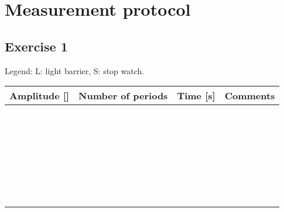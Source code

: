 \documentclass[a4paper,german,12pt,smallheadings]{scrartcl}
\begin{document}
\section*{Measurement protocol}
\subsection*{Exercise 1}
Legend: L: light barrier, S: stop watch.

\begin{tabular}{l|l|l|l}
  Amplitude [\quad\quad] & Number of periods & Time [s] \qquad\qquad\qquad & Comments \qquad\qquad\qquad\qquad\qquad\qquad \\
  \hline
   &  &  &  \\
  \hline
   &  &  &  \\
  \hline
   &  &  &  \\
  \hline
   &  &  &  \\
  \hline
   &  &  &  \\
  \hline
   &  &  &  \\
  \hline
   &  &  &  \\
  \hline
   &  &  &  \\
  \hline
   &  &  &  \\
  \hline
   &  &  &  \\
  \hline
   &  &  &  \\
  \hline
   &  &  &  \\
  \hline
   &  &  &  \\
  \hline
   &  &  &  \\
  \hline
   &  &  &  \\
  \hline
   &  &  &  \\
  \hline
   &  &  &  \\
  \hline
   &  &  &  \\
  \hline
   &  &  &  \\
  \hline
   &  &  &  \\
  \hline
   &  &  &  \\
  \hline
   &  &  &  \\
  \hline
   &  &  &  \\
  \hline
   &  &  &  \\
  \hline
   &  &  &  \\
  \hline
   &  &  &  \\
  \hline
   &  &  &  \\
  \hline
   &  &  &  \\
  \hline
   &  &  &  \\
\end{tabular}
\end{document}
